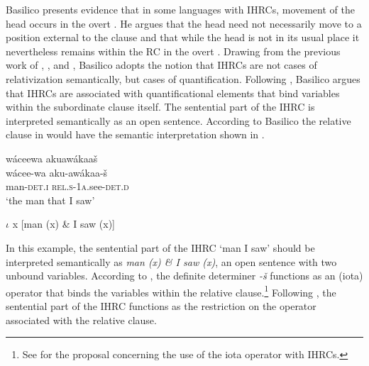 \documentclass[output=paper]{LSP/langsci}
\begin{document}
\largerpage
Basilico presents evidence that in some languages with IHRCs, movement of the head occurs in the overt . He argues that the head need not necessarily move to a position external to the clause and that while the head is not in its usual place it nevertheless remains within the RC in the overt . Drawing from the previous work of \citet{Williamson1987}, \citet{Jelinek1987}, and \citet{Culy1990}, Basilico adopts the notion that IHRCs are not cases of relativization semantically, but cases of quantification. Following \citet{Heim1982}, Basilico argues that IHRCs are associated with quantificational elements that bind variables within the subordinate clause itself. The sentential part of the IHRC is interpreted semantically as an open sentence. According to Basilico the  relative clause in  would have the semantic interpretation shown in .

\ea \label{boyle42}
\glll wáceewa     akuawákaa\v{s}\\
wácee-wa       aku-awákaa-\v{s}\\
man-\textsc{det.i}  \textsc{rel.s-1a}.see-\textsc{det.d}\\
\trans `the man that I saw'
\z

\ea \label{boyle43}
 $\iota$ x [man (x) \& I saw (x)]  
\z

\largerpage
In this example, the sentential part of the IHRC `man I saw' should be interpreted semantically as \textit{man (x) \& I saw (x)}, an open sentence with two unbound variables.  According to \citeauthor{Basilico1996}, the definite determiner 
\textit{-\v{s}} functions as an (iota) operator that binds the variables within the relative clause.\footnote{See \citet{Jelinek1987} for the proposal concerning the use of the iota operator with IHRCs.} Following \citet{Culy1990}, the sentential part of the IHRC functions as the restriction on the operator associated with the relative clause.  
\end{document}
